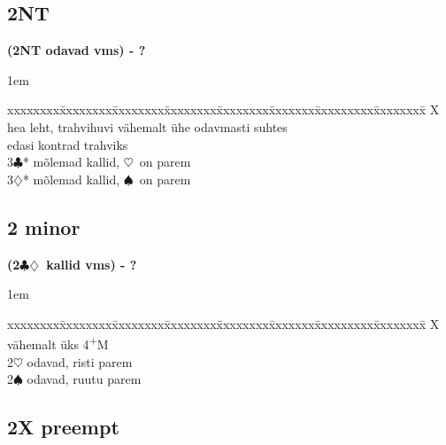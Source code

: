 \documentclass[10pt]{article}
\renewcommand{\c}{$\clubsuit$}
\renewcommand{\d}{$\diamondsuit$}
\newcommand{\h}{$\heartsuit$}
\newcommand{\s}{$\spadesuit$}
\newcommand{\p}{\textsuperscript{+}}
\newcommand{\x}{DBL}
\newenvironment{bidtable}[1][]
{\textbf{#1}
  \begin{adjustwidth}{1em}{}
    \addvspace{2pt}
    \begin{tabbing}
      xxxxxxxx\=xxxxxxxx\=xxxxxxxx\=xxxxxxxx\=xxxxxxxx\=xxxxxxx\=xxxxxxxxx\=xxxxxxxx\=\kill}
{\end{tabbing}\end{adjustwidth}\bigskip}%
\begin{document}




\subsection{2NT}

\begin{bidtable}[(2NT odavad vms) - ?]
X    \> hea leht, trahvihuvi vähemalt ühe odavmasti suhtes \\
     \> edasi kontrad trahviks                             \\
3\c* \> mõlemad kallid, \h\ on parem                       \\
3\d* \> mõlemad kallid, \s\ on parem
\end{bidtable}

\subsection{2 minor}

\begin{bidtable}[(2\c\d\ kallid vms) - ?]
X   \> vähemalt üks 4\p M     \\
2\h {} odavad, risti parem \\
2\s {} odavad, ruutu parem
\end{bidtable}

\newpage
\subsection{2X preempt}
\end{document}
